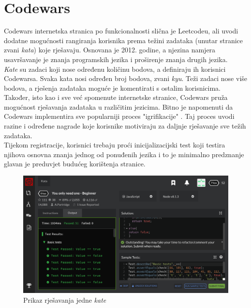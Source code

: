 \documentclass[times, utf8, zavrsni]{fer}
\begin{document}
		\section{Codewars}
		\label{sec:codewars}
		Codewars internetska stranica po funkcionalnosti slična je Leetcodeu, ali uvodi dodatne mogućnosti rangiranja korisnika prema težini zadataka  (unutar stranice zvani \textit{kata}) koje rješavaju. Osnovana je 2012. godine, a  njezina namjera usavršavanje je znanja programskih jezika i proširenje znanja drugih jezika.\\
		\textit{Kate} su zadaci koji nose određenu količinu bodova, a definiraju ih korisnici Codewarsa. Svaka kata nosi određen broj bodova, zvani \textit{kyu}. Teži zadaci nose više bodova, a rješenja zadataka moguće je komentirati s ostalim korisnicima. Također, isto kao i sve već spomenute internetske stranice, Codewars pruža mogućnost rješavanja zadataka u različitim jezicima. Bitno je napomenuti da Codewars implementira sve popularniji proces "igrifikacije" . Taj proces uvodi razine i određene nagrade koje korisnike motiviraju za daljnje rješavanje sve težih zadataka.\\
		Tijekom registracije, korisnici trebaju proći inicijalizacijski test koji testira njihova osnovna znanja jednog od ponuđenih jezika i to je minimalno predznanje glavan je preduvjet budućeg korištenja stranice.
		\begin{figure}[H]
			\centering
			\includegraphics[width=\linewidth]{pictures/prikazi/Codewars.png}
			\caption{Prikaz rješavanja jedne \textit{kate}}
			\label{fig:codewars}
		\end{figure}
	
\end{document}
